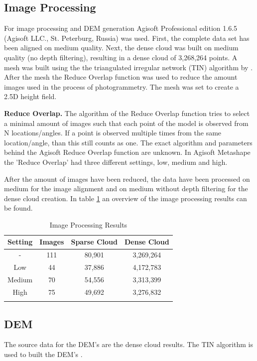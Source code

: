 \documentclass{isprs} %
\begin{document}
\subsection{Image Processing}
For image processing and DEM generation Agisoft Professional edition 1.6.5 (Agisoft LLC., St. Peterburg, Russia) was used.
First, the complete data set has been aligned on medium quality.
Next, the dense cloud was built on medium quality (no depth filtering), resulting in a dense cloud of 3,268,264 points.
A mesh was built using the the triangulated irregular network (TIN) algorithm by \citet{axelsson1999processing}. 
After the mesh the Reduce Overlap function was used to reduce the amount images used in the process of photogrammetry. 
The mesh was set to create a 2.5D height field.

\textbf{Reduce Overlap.} 
The algorithm of the Reduce Overlap function tries to select a minimal amount of images such that each point of the model is observed from N locations/angles.
If a point is observed multiple times from the same location/angle, than this still counts as one. 
The exact algorithm and parameters behind the Agisoft Reduce Overlap function are unknown.
In Agisoft Metashape the 'Reduce Overlap' had three different settings, low, medium and high. 

After the amount of images have been reduced, the data have been processed on medium for the image alignment and on medium without depth filtering for the dense cloud creation.
In table \ref{tab:ImageProcessing} an overview of the image processing results can be found.

\begin{table}[htb]
    \centering
    \caption{Image Processing Results}
    \begin{tabular}{@{}cccc@{}}
    \toprule
    \textbf{Setting} & \textbf{Images} & \multicolumn{1}{l}{\textbf{Sparse Cloud}} & \multicolumn{1}{l}{\textbf{Dense Cloud}} \\ \midrule
    -      & 111 & 80,901 & 3,269,264 \\
    Low    & 44  & 37,886 & 4,172,783 \\
    Medium & 70  & 54,556 & 3,313,399 \\
    High   & 75  & 49,692 & 3,276,832 \\ \bottomrule
    \label{tab:ImageProcessing}
\end{tabular}
\end{table}

\subsection{DEM}
The source data for the DEM's are the dense cloud results. 
The TIN algorithm is used to built the DEM's \citep{axelsson1999processing}.
\end{document}
